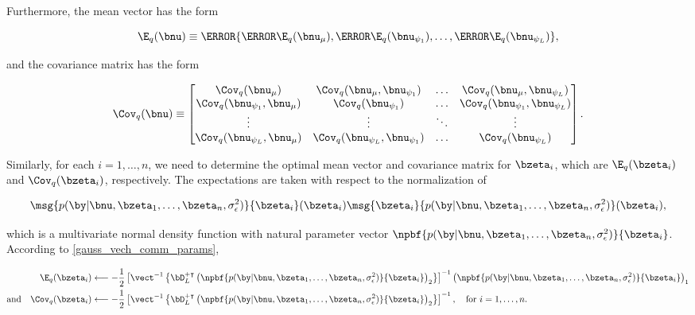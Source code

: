 \documentclass[12pt]{article}
\def\sigsqeps{\sigma^2_{\epsilon}}
\def\numu{\bnu_\mu}
\newcommand\nupsi[1]{\bnu_{\psi_{#1}}}
\theoremstyle{plain}
\theoremstyle{definition}
\theoremstyle{remark}
\begin{document}
\noindent Furthermore, the mean vector has the form

\begin{equation}
	\E_q (\bnu) \equiv \T{
		\left\{ \T{\E_q (\numu)}, \T{\E_q (\nupsi{1})}, \dots, \T{\E_q (\nupsi{L})} \right\}
	},
\label{exp_lik_nu}
\end{equation}

\noindent and the covariance matrix has the form

\begin{equation}
	\Cov_q (\bnu) \equiv \begin{bmatrix}
		\Cov_q (\numu) & \Cov_q (\numu, \nupsi{1}) & \dots & \Cov_q (\numu, \nupsi{L}) \\
		\Cov_q (\nupsi{1}, \numu) & \Cov_q (\nupsi{1}) & \dots & \Cov_q (\nupsi{1}, \nupsi{L}) \\
		\vdots & \vdots & \ddots & \vdots \\
		\Cov_q (\nupsi{L}, \numu) & \Cov_q (\nupsi{L}, \nupsi{1}) & \dots & \Cov_q (\nupsi{L}) \\
	\end{bmatrix}.
\label{cov_lik_nu}
\end{equation}

\noindent Similarly, for each $i = 1, \dots, n$, we need to determine the optimal mean vector and covariance matrix
for $\bzeta_i$, which are $\E_q (\bzeta_i)$ and $\Cov_q (\bzeta_i)$, respectively. The expectations are taken with
respect to the normalization of

\[
	\msg{p (\by | \bnu, \bzeta_1, \dots, \bzeta_n, \sigsqeps)}{\bzeta_i} (\bzeta_i)
	\msg{\bzeta_i}{p (\by | \bnu, \bzeta_1, \dots, \bzeta_n, \sigsqeps)} (\bzeta_i),
\]

\noindent which is a multivariate normal density function with natural parameter vector $\npbf{p (\by | \bnu, \bzeta_1,
\dots, \bzeta_n, \sigsqeps)}{\bzeta_i}$. According to \eqref{gauss_vech_comm_params},

\begin{align}
\begin{split}
	\E_q (\bzeta_i)
		&\longleftarrow
			-\frac12 \left[
				\vect^{-1} \left\{
					\bD_L^{+ \intercal}
					\left( \npbf{p (\by | \bnu, \bzeta_1, \dots, \bzeta_n, \sigsqeps)}{\bzeta_i} \right)_2
				\right\}
			\right]^{-1} \left( \npbf{p (\by | \bnu, \bzeta_1, \dots, \bzeta_n, \sigsqeps)}{\bzeta_i} \right)_1 \\
	\text{and} \quad
	\Cov_q (\bzeta_i)
		&\longleftarrow
			-\frac12 \left[
				\vect^{-1} \left\{
					\bD_L^{+ \intercal}
					\left( \npbf{p (\by | \bnu, \bzeta_1, \dots, \bzeta_n, \sigsqeps)}{\bzeta_i} \right)_2
				\right\}
			\right]^{-1}, \quad \text{for $i = 1, \dots, n$.}
\end{split}
\label{exp_lik_zeta}
\end{align}
\end{document}
